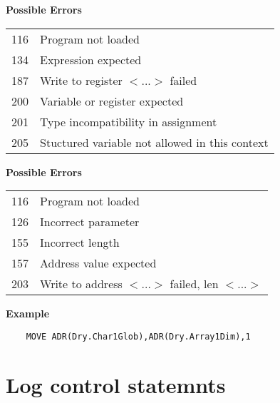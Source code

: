 {\samepage
{\bf Possible Errors}
\begin{flushleft}
\begin{tabular}{ll}
116 & Program not loaded \\
134 & Expression expected \\
187 & Write to register $<$...$>$ failed \\
200 & Variable or register expected \\
201 & Type incompatibility in assignment \\
205 & Stuctured variable not allowed in this context
\end{tabular}
\end{flushleft}
} %
{} %


{\samepage
{\bf Possible Errors}
\begin{flushleft}
\begin{tabular}{ll}
116 & Program not loaded \\
126 & Incorrect parameter \\
155 & Incorrect length \\
157 & Address value expected \\
203 & Write to address $<$...$>$ failed, len $<$...$>$
\end{tabular}
\end{flushleft}
} %
\pagebreak[1]

{\samepage
{\bf Example}
\begin{verbatim}
    MOVE ADR(Dry.Char1Glob),ADR(Dry.Array1Dim),1
\end{verbatim}
} %

\pagebreak[1]
\section{Log control statemnts}

